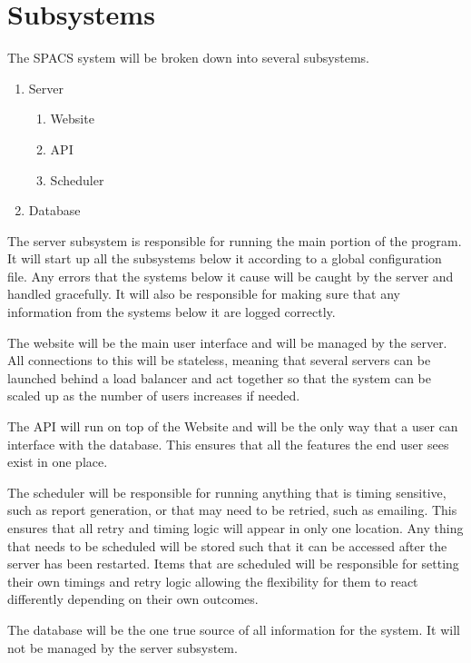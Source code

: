 \section{Subsystems}

\par
The SPACS system will be broken down into several subsystems.

\par
\begin{enumerate}
	\item Server
	\begin{enumerate}
		\item Website
		\item API
		\item Scheduler
	\end{enumerate}
	\item Database
\end{enumerate}

\par
The server subsystem is responsible for running the main portion of the program. It will start up all the subsystems below it according to a global configuration file. Any errors that the systems below it cause will be caught by the server and handled gracefully. It will also be responsible for making sure that any information from the systems below it are logged correctly.

\par
The website will be the main user interface and will be managed by the server. All connections to this will be stateless, meaning that several servers can be launched behind a load balancer and act together so that the system can be scaled up as the number of users increases if needed.

\par
The API will run on top of the Website and will be the only way that a user can interface with the database. This ensures that all the features the end user sees exist in one place.

\par
The scheduler will be responsible for running anything that is timing sensitive, such as report generation, or that may need to be retried, such as emailing. This ensures that all retry and timing logic will appear in only one location. Any thing that needs to be scheduled will be stored such that it can be accessed after the server has been restarted. Items that are scheduled will be responsible for setting their own timings and retry logic allowing the flexibility for them to react differently depending on their own outcomes.

\par
The database will be the one true source of all information for the system. It will not be managed by the server subsystem.

